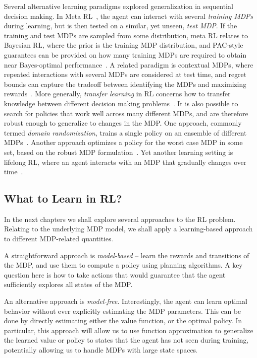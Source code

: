 Several alternative learning paradigms explored generalization in sequential decision making. In Meta RL~\cite{beck2023survey}, the agent can interact with several \textit{training MDPs} during learning, but is then tested on a similar, yet unseen, \textit{test MDP}. If the training and test MDPs are sampled from some distribution, meta RL relates to Bayesian RL, where the prior is the training MDP distribution, and PAC-style guarantees can be provided on how many training MDPs are required to obtain near Bayes-optimal performance~\cite{tamar2022regularization}. A related paradigm is contextual MDPs, where repeated interactions with several MDPs are considered at test time, and regret bounds can capture the tradeoff between identifying the MDPs and maximizing rewards~\cite{hallak2015contextual}.
More generally, \textit{transfer learning} in RL concerns how to transfer knowledge between different decision making problems~\cite{taylor2009transfer,kirk2023survey}.
It is also possible to search for policies that work well across many different MDPs, and are therefore robust enough to generalize to changes in the MDP. One approach, commonly termed \textit{domain randomization}, trains a single policy on an ensemble of different MDPs~\cite{tobin2017domain}. Another approach optimizes a policy for the worst case MDP in some set, based on the robust MDP formulation~\cite{nilim2005robust}. Yet another learning setting is lifelong RL, where an agent interacts with an MDP that gradually changes over time~\cite{khetarpal2022towards}.


\subsection{What to Learn in RL?}
In the next chapters we shall explore several approaches to the RL problem. Relating to the underlying MDP model, we shall apply a learning-based approach to different MDP-related quantities. 

A straightforward approach is \textit{model-based} -- learn the rewards and transitions of the MDP, and use them to compute a policy using planning algorithms. A key question here is how to take actions that would guarantee that the agent sufficiently explores all states of the MDP.

An alternative approach is \textit{model-free}. Interestingly, the agent can learn optimal behavior without ever explicitly estimating the MDP parameters. This can be done by directly estimating either the value function, or the optimal policy. In particular, this approach will allow us to use function approximation to generalize the learned value or policy to states that the agent has not seen during training, potentially allowing us to handle MDPs with large state spaces.



